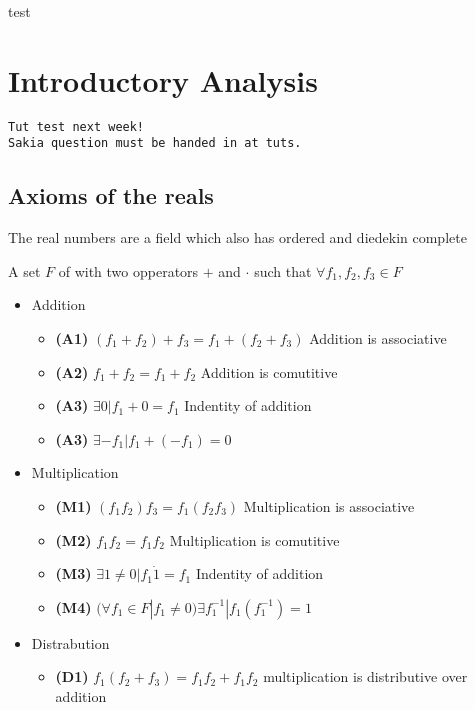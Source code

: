 \documentclass{tufte-handout}
\providecommand{\tightlist}{%
  \setlength{\itemsep}{0pt}\setlength{\parskip}{0pt}}
\begin{document}
test\hypertarget{introductory-analysis}{%
\section{Introductory Analysis}\label{introductory-analysis}}

\begin{verbatim}
Tut test next week!
Sakia question must be handed in at tuts.
\end{verbatim}\hypertarget{axioms-of-the-reals}{%
\subsection{Axioms of the reals}\label{axioms-of-the-reals}}

The real numbers are a field which also has ordered and diedekin
complete

\begin{description}
\tightlist
\item[Field]
A set \(F\) of with two opperators \(+\) and \(\cdot\) such that
\(\forall f_1, f_2, f_3 \in F\)
\end{description}

\begin{itemize}
\tightlist
\item
  Addition

  \begin{itemize}
  \tightlist
  \item
    \textbf{(A1)} \((f_1+f_2)+f_3 = f_1 + (f_2 + f_3)\) Addition is
    associative
  \item
    \textbf{(A2)} \(f_1+f_2 = f_1+f_2\) Addition is comutitive
  \item
    \textbf{(A3)} \(\exists 0 | f_1 + 0 = f_1\) Indentity of addition
  \item
    \textbf{(A3)} \(\exists -f_1 | f_1 + (-f_1) = 0\)
  \end{itemize}
\item
  Multiplication

  \begin{itemize}
  \tightlist
  \item
    \textbf{(M1)} \((f_1 f_2) f_3 = f_1 (f_2 f_3)\) Multiplication is
    associative
  \item
    \textbf{(M2)} \(f_1 f_2 = f_1 f_2\) Multiplication is comutitive
  \item
    \textbf{(M3)} \(\exists 1 \neq 0 | f_1 \dot 1 = f_1\) Indentity of
    addition
  \item
    \textbf{(M4)}
    \((\forall f_1 \in F | f_1 \neq 0) \exists f_1^{-1} | f_1 ( f_1^{-1}) = 1\)
  \end{itemize}
\item
  Distrabution

  \begin{itemize}
  \tightlist
  \item
    \textbf{(D1)} \(f_1(f_2+f_3)=f_1f_2 + f_1f_2\) multiplication is
    distributive over addition
  \end{itemize}
\end{itemize}
\end{document}
